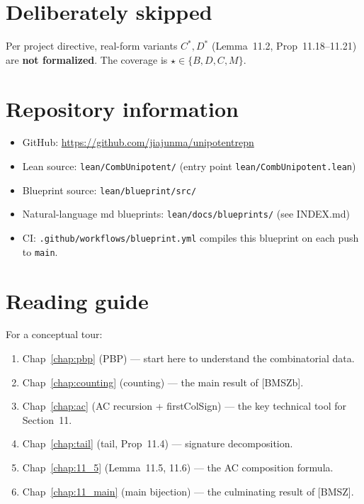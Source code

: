 \section{Deliberately skipped}

Per project directive, real-form variants $C^*, D^*$ (Lemma~11.2, Prop~11.18--11.21)
are \textbf{not formalized}. The coverage is $\star \in \{B, D, C, M\}$.

\section{Repository information}

\begin{itemize}
  \item GitHub: \url{https://github.com/jiajunma/unipotentrepn}
  \item Lean source: \texttt{lean/CombUnipotent/} (entry point \texttt{lean/CombUnipotent.lean})
  \item Blueprint source: \texttt{lean/blueprint/src/}
  \item Natural-language md blueprints: \texttt{lean/docs/blueprints/} (see INDEX.md)
  \item CI: \texttt{.github/workflows/blueprint.yml} compiles this blueprint on each push to \texttt{main}.
\end{itemize}

\section{Reading guide}

For a conceptual tour:
\begin{enumerate}
  \item Chap~\ref{chap:pbp} (PBP) — start here to understand the combinatorial data.
  \item Chap~\ref{chap:counting} (counting) — the main result of [BMSZb].
  \item Chap~\ref{chap:ac} (AC recursion + firstColSign) — the key technical tool for Section~11.
  \item Chap~\ref{chap:tail} (tail, Prop~11.4) — signature decomposition.
  \item Chap~\ref{chap:11_5} (Lemma~11.5, 11.6) — the AC composition formula.
  \item Chap~\ref{chap:11_main} (main bijection) — the culminating result of [BMSZ].
\end{enumerate}


